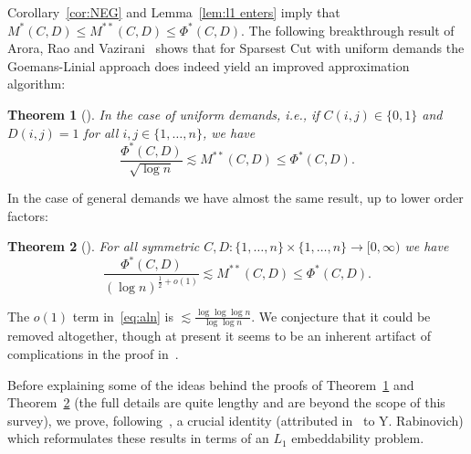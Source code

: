 \documentclass{icm2010}
\newtheorem{theorem}{Theorem}[section]
\theoremstyle{definition}
\newcommand{\1}{\mathbf{1}}
\renewcommand{\le}{\leqslant}
\begin{document}
Corollary~\ref{cor:NEG} and Lemma~\ref{lem:l1 enters} imply that
$M^*(C,D)\le M^{**}(C,D)\le \Phi^*(C,D)$. The following breakthrough
result of Arora, Rao and Vazirani~\cite{ARV04} shows that for
Sparsest Cut with uniform demands the Goemans-Linial approach does
indeed yield an improved approximation algorithm:

\begin{theorem}[\cite{ARV04}]\label{thm:ARV} In the case of uniform
demands, i.e., if $C(i,j)\in \{0,1\}$ and $D(i,j)=1$ for all $i,j\in
\{1,\ldots,n\}$, we have
\begin{equation}\label{eq:ARV}
\frac{\Phi^*(C,D)}{\sqrt{\log n}}\lesssim M^{**}(C,D)\le
\Phi^*(C,D).
\end{equation}
\end{theorem}
In the case of general demands we have almost the same result, up to
lower order factors:
\begin{theorem}[\cite{ALN08}]\label{thm:aln}
For all symmetric $C,D:\{1,\ldots,n\}\times \{1,\ldots,n\}\to
[0,\infty)$ we have
\begin{equation}\label{eq:aln}
\frac{\Phi^*(C,D)}{(\log n)^{\frac12+o(1)}}\lesssim M^{**}(C,D)\le
\Phi^*(C,D).
\end{equation}
\end{theorem}
The $o(1)$ term in~\eqref{eq:aln} is $\lesssim \frac{\log\log\log
n}{\log\log n}$. We conjecture that it could be removed altogether,
though at present it seems to be an inherent artifact of
complications in the proof in~\cite{ALN08}.

Before explaining some of the ideas behind the proofs of
Theorem~\ref{thm:ARV} and Theorem~\ref{thm:aln} (the full details
are quite lengthy and are beyond the scope of this survey), we
prove, following~\cite[Prop.\ 15.5.2]{Mat02}, a crucial identity
(attributed in~\cite{Mat02} to Y. Rabinovich) which reformulates
these results in terms of an $L_1$ embeddability problem.
\end{document}
